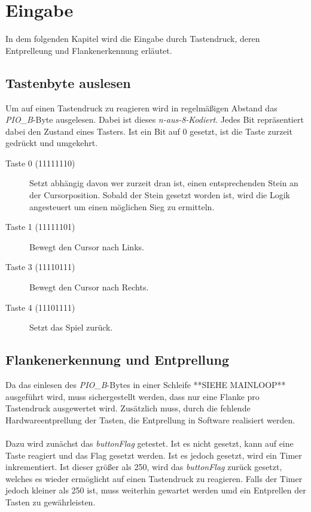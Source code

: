\newpage
\section{Eingabe}
    In dem folgenden Kapitel wird die Eingabe durch Tastendruck, deren Entprelleung und Flankenerkennung erläutet.
    
    \subsection{Tastenbyte auslesen}
        Um auf einen Tastendruck zu reagieren wird in regelmäßigen Abstand das \textit{PIO\_B}-Byte ausgelesen.
        Dabei ist dieses \textit{n-aus-8-Kodiert}. Jedes Bit repräsentiert dabei den Zustand eines Tasters.
        Ist ein Bit auf 0 gesetzt, ist die Taste zurzeit gedrückt und umgekehrt.

        \begin{description}
            \item [Taste 0 (11111110)]
            Setzt abhängig davon wer zurzeit dran ist, einen entsprechenden Stein an der Cursorposition.
            Sobald der Stein gesetzt worden ist, wird die Logik angesteuert um einen möglichen Sieg zu ermitteln.
            \item [Taste 1 (11111101)] Bewegt den Cursor nach Links.
            \item [Taste 3 (11110111)] Bewegt den Cursor nach Rechts.
            \item [Taste 4 (11101111)] Setzt das Spiel zurück.
        \end{description}


    \subsection{Flankenerkennung und Entprellung}
        Da das einlesen des \textit{PIO\_B}-Bytes in einer Schleife **SIEHE MAINLOOP** ausgeführt wird,
        muss sichergestellt werden, dass nur eine Flanke pro Tastendruck ausgewertet wird.
        Zusätzlich muss, durch die fehlende Hardwareentprellung der Tasten, die Entprellung in Software realisiert werden.
        \\
        \\
        Dazu wird zunächst das \textit{buttonFlag} getestet. Ist es nicht gesetzt, kann auf eine Taste reagiert und
        das Flag gesetzt werden. Ist es jedoch gesetzt, wird ein Timer inkrementiert.
        Ist dieser größer als 250, wird das \textit{buttonFlag} zurück gesetzt,
        welches es wieder ermöglicht auf einen Tastendruck zu reagieren.
        Falls der Timer jedoch kleiner als 250 ist, muss weiterhin gewartet werden umd ein Entprellen der Tasten
        zu gewährleisten.

